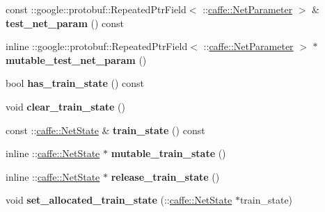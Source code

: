 \begin{DoxyCompactItemize}
const \+::google\+::protobuf\+::\+Repeated\+Ptr\+Field$<$ \+::\mbox{\hyperlink{classcaffe_1_1_net_parameter}{caffe\+::\+Net\+Parameter}} $>$ \& {\bfseries test\+\_\+net\+\_\+param} () const
\item 
\mbox{\label{classcaffe_1_1_solver_parameter_a36d1dbd4c8fc53f5f9a01c6fd631f464}} 
inline \+::google\+::protobuf\+::\+Repeated\+Ptr\+Field$<$ \+::\mbox{\hyperlink{classcaffe_1_1_net_parameter}{caffe\+::\+Net\+Parameter}} $>$ $\ast$ {\bfseries mutable\+\_\+test\+\_\+net\+\_\+param} ()
\item 
\mbox{\label{classcaffe_1_1_solver_parameter_ad213832d2b2f2e60886ee6d255c9fb3d}} 
bool {\bfseries has\+\_\+train\+\_\+state} () const
\item 
\mbox{\label{classcaffe_1_1_solver_parameter_af4b536b5f2b7b92ff199f9c4edfa9c5f}} 
void {\bfseries clear\+\_\+train\+\_\+state} ()
\item 
\mbox{\label{classcaffe_1_1_solver_parameter_aeb87ab406b85c2ca112b3afd8516f737}} 
const \+::\mbox{\hyperlink{classcaffe_1_1_net_state}{caffe\+::\+Net\+State}} \& {\bfseries train\+\_\+state} () const
\item 
\mbox{\label{classcaffe_1_1_solver_parameter_a76f54734bae11e7567ac8b58eaa16d10}} 
inline \+::\mbox{\hyperlink{classcaffe_1_1_net_state}{caffe\+::\+Net\+State}} $\ast$ {\bfseries mutable\+\_\+train\+\_\+state} ()
\item 
\mbox{\label{classcaffe_1_1_solver_parameter_acddc002d8a4abefdb06b5c8fb83ccf01}} 
inline \+::\mbox{\hyperlink{classcaffe_1_1_net_state}{caffe\+::\+Net\+State}} $\ast$ {\bfseries release\+\_\+train\+\_\+state} ()
\item 
\mbox{\label{classcaffe_1_1_solver_parameter_a8e6a105a8f9bc2c430425a645ca45a3e}} 
void {\bfseries set\+\_\+allocated\+\_\+train\+\_\+state} (\+::\mbox{\hyperlink{classcaffe_1_1_net_state}{caffe\+::\+Net\+State}} $\ast$train\+\_\+state)
\item 
\mbox{\label{classcaffe_1_1_solver_parameter_a7f2ea623f0db2b50fc4c6008297529fc}} 

\end{DoxyCompactItemize}
